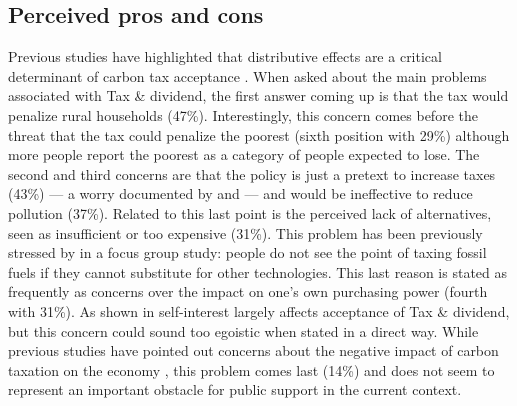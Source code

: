 \documentclass[english,5p,authoryear]{elsarticle}
\begin{document}
    \subsection{Perceived pros and cons}



Previous studies have highlighted that distributive effects are a critical determinant of carbon tax acceptance \citep[e.g.][]{kallbekken_saelen_2011,brannlund_tax_2012,gevrek_public_2015}. When asked about the main problems associated with Tax \& dividend, the first answer coming up is that the tax would penalize rural households (47\%). Interestingly, this concern comes before the threat that the tax could penalize the poorest (sixth position with 29\%) although more people report the poorest as a category of people expected to lose. The second and third concerns are that the policy is just a pretext to increase taxes (43\%) --- a worry documented by \citet{dresner_social_2006} and \citet{klok_et_al_2006} --- and would be ineffective to reduce pollution (37\%). Related to this last point is the perceived lack of alternatives, seen as insufficient or too expensive (31\%). This problem has been previously stressed by \citet{kallbekken_aasen_2010} in a focus group study: people do not see the point of taxing fossil fuels if they cannot substitute for other technologies. This last reason is stated as frequently as concerns over the impact on one's own purchasing power (fourth with 31\%). As shown in \citet{douenne_can_2019} self-interest largely affects acceptance of Tax \& dividend, but this concern could sound too egoistic when stated in a direct way. While previous studies have pointed out concerns about the negative impact of carbon taxation on the economy \citep[e.g.][]{thalmann_public_2004,carattini_green_2017}, this problem comes last (14\%) and does not seem to represent an important obstacle for public support in the current context. %

\end{document}
